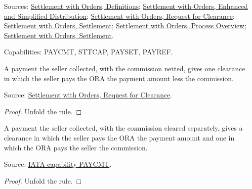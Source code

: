 \begin{definition}
  Sources: \href{https://standards.atlassian.net/wiki/spaces/SWO/pages/574915056}{Settlement with Orders, Definitions};
  \href{https://standards.atlassian.net/wiki/spaces/SWO/pages/574653091}{Settlement with Orders, Enhanced and Simplified Distribution};
  \href{https://standards.atlassian.net/wiki/spaces/SWO/pages/574259760}{Settlement with Orders, Request for Clearance};
  \href{https://standards.atlassian.net/wiki/spaces/SWO/pages/574816478}{Settlement with Orders, Settlement};
  \href{https://standards.atlassian.net/wiki/spaces/SWO/pages/574881933}{Settlement with Orders, Process Overview};
  \href{https://standards.atlassian.net/wiki/spaces/SWO/pages/574816478/Settlement}{Settlement with Orders, Settlement}.

  Capabilities: PAYCMT, STTCAP, PAYSET, PAYREF.
\end{definition}

\begin{theorem}
  \label{thm:accounting-seller-netted}
  A payment the seller collected, with the commission netted, gives one
  clearance in which the seller pays the ORA the payment amount less the
  commission.

  Source: \href{https://standards.atlassian.net/wiki/spaces/SWO/pages/574259760}{Settlement with Orders, Request for Clearance}.
\end{theorem}
\begin{proof}
  Unfold the rule.
\end{proof}

\begin{theorem}
  \label{thm:accounting-seller-separate}
  A payment the seller collected, with the commission cleared separately,
  gives a clearance in which the seller pays the ORA the payment amount and
  one in which the ORA pays the seller the commission.

  Source: \href{https://retailing.iata.org/armi/docs/PAYCMT/}{IATA capability PAYCMT}.
\end{theorem}
\begin{proof}
  Unfold the rule.
\end{proof}

